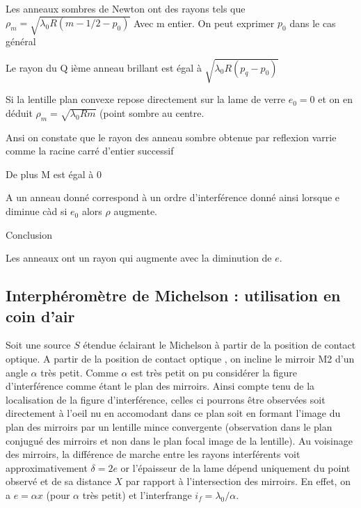\documentclass[a4paper,12pt]{article}
\theoremstyle{StyleTheo_will}
\theoremstyle{remark}
\begin{document}
Les anneaux sombres de Newton ont des rayons tels que $\rho_m = \sqrt{\lambda_0 R(m-1/2-p_0)} $ Avec m entier. On peut exprimer $p_0$ dans le cas général

Le rayon du Q ième anneau brillant est égal à $\sqrt{\lambda_0  R (p_q-p_0)}$

Si la lentille plan convexe repose directement sur la lame de verre $e_0 =0$ et on en déduit $\rho_m = \sqrt{\lambda_0 R m} $ (point sombre au centre.

Ansi on constate que le rayon des anneau sombre obtenue par reflexion varrie comme la racine carré d'entier successif

De plus M est égal à 0

A un anneau donné correspond à un ordre d'interférence donné ainsi lorsque e diminue càd si $e_0$ alors $\rho$ augmente.

Conclusion

Les anneaux ont un rayon qui augmente avec la diminution de $e$.

\subsection{Interphéromètre de Michelson : utilisation en coin d'air}

Soit une source $S$ étendue éclairant le Michelson à partir de la position de contact optique. A partir de la position de contact optique , on incline le mirroir M2 d'un angle $\alpha$ très petit. Comme $\alpha$ est très petit on pu considérer la figure d'interférence comme étant le plan des mirroirs. Ainsi compte tenu de la localisation de la figure d'interférence, celles ci pourrons être observées soit directement à l'oeil nu en accomodant dans ce plan soit en formant l'image du plan des mirroirs par un lentille mince convergente (observation dans le plan conjugué des mirroirs et non dans le plan focal image de la lentille). Au voisinage des mirroirs, la différence de marche entre les rayons interférents voit approximativement $\delta = 2e$ or l'épaisseur de la lame dépend uniquement du point observé et de sa distance $X$ par rapport à l'intersection des mirroirs. En effet, on a $e= \alpha x$ (pour $\alpha$ très petit) et l'interfrange $i_f= \lambda_0/\alpha$.
\end{document}
